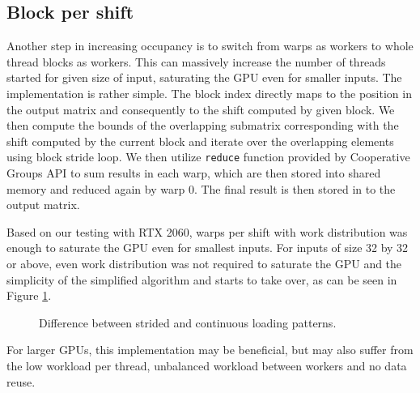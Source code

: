 \subsection{Block per shift}

Another step in increasing occupancy is to switch from warps as workers to whole thread blocks as workers. This can massively increase the number of threads started for given size of input, saturating the GPU even for smaller inputs.
The implementation is rather simple. The block index directly maps to the position in the output matrix and consequently to the shift computed by given block. We then compute the bounds of the overlapping submatrix corresponding with the shift computed by the current block and iterate over the overlapping elements using block stride loop. We then utilize \texttt{reduce} function provided by Cooperative Groups API to sum results in each warp, which are then stored into shared memory and  reduced again by warp 0. The final result is then stored in to the output matrix.

Based on our testing with RTX 2060, warps per shift with work distribution was enough to saturate the GPU even for smallest inputs. For inputs of size 32 by 32 or above, even work distribution was not required to saturate the GPU and the simplicity of the simplified algorithm and starts to take over, as can be seen in Figure \ref{fig:block_per_shift_local_results}. 

\begin{figure}[ht]
	\centering
	\def\svgwidth{0.6\textwidth}
	
	\caption{Difference between strided and continuous loading patterns.}
	\label{fig:block_per_shift_local_results}
\end{figure}

For larger GPUs, this implementation may be beneficial, but may also suffer from the low workload per thread, unbalanced workload between workers and no data reuse.



